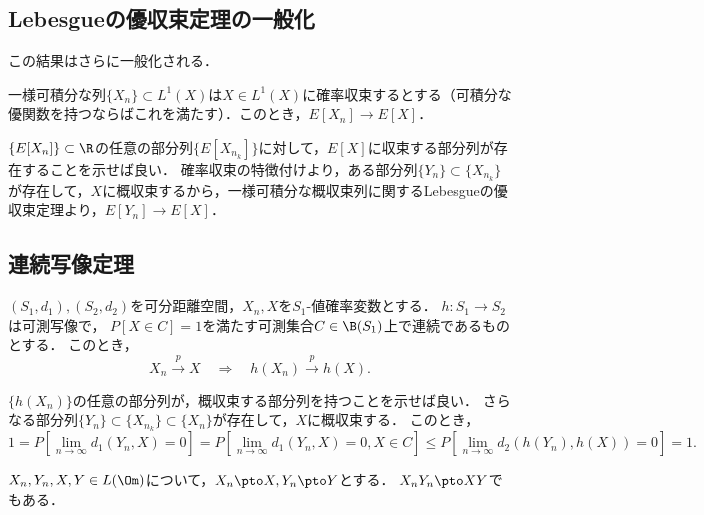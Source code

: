 \documentclass[uplatex,dvipdfmx]{jsreport}
\begin{document}
\subsection{Lebesgueの優収束定理の一般化}

\begin{tcolorbox}[colframe=ForestGreen, colback=ForestGreen!10!white,breakable,colbacktitle=ForestGreen!40!white,coltitle=black,fonttitle=\bfseries\sffamily,
title=]
    この結果はさらに一般化される．
\end{tcolorbox}

\begin{theorem}
    一様可積分な列$\{X_n\}\subset L^1(X)$は$X\in L^1(X)$に確率収束するとする（可積分な優関数を持つならばこれを満たす）．このとき，$E[X_n]\to E[X]$．
\end{theorem}
\begin{Proof}
    $\{E[X_n]\}\subset\R$の任意の部分列$\{E[X_{n_k}]\}$に対して，$E[X]$に収束する部分列が存在することを示せば良い．
    確率収束の特徴付けより，ある部分列$\{Y_n\}\subset\{X_{n_k}\}$が存在して，$X$に概収束するから，一様可積分な概収束列に関するLebesgueの優収束定理より，$E[Y_n]\to E[X]$．
\end{Proof}

\subsection{連続写像定理}

\begin{proposition}[確率収束に関する連続写像定理]
    $(S_1,d_1),(S_2,d_2)$を可分距離空間，$X_n,X$を$S_1$-値確率変数とする．
    $h:S_1\to S_2$は可測写像で，
    $P[X\in C]=1$を満たす可測集合$C\in\B(S_1)$上で連続であるものとする．
    このとき，
    \[X_n\xrightarrow{p}X\quad\Rightarrow\quad h(X_n)\xrightarrow{p}h(X).\]
\end{proposition}
\begin{Proof}
    $\{h(X_n)\}$の任意の部分列が，概収束する部分列を持つことを示せば良い．
    さらなる部分列$\{Y_n\}\subset\{X_{n_k}\}\subset\{X_n\}$が存在して，$X$に概収束する．
    このとき，
    \[1=P[\lim_{n\to\infty}d_1(Y_n,X)=0]=P[\lim_{n\to\infty}d_1(Y_n,X)=0,X\in C]\le P[\lim_{n\to\infty}d_2(h(Y_n),h(X))=0]=1.\]
\end{Proof}

\begin{corollary}
    $X_n,Y_n,X,Y\in L(\Om)$について，$X_n\pto X,Y_n\pto Y$とする．
    $X_nY_n\pto XY$でもある．
\end{corollary}
\end{document}
